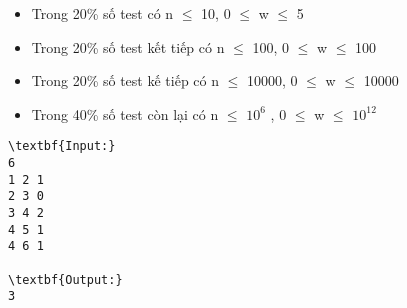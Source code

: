 \begin{itemize}
	\item Trong 20\% số test có n  $\le$  10, 0  $\le$  w  $\le$  5
	\item Trong 20\% số test kết tiếp có n  $\le$  100, 0  $\le$  w  $\le$  100
	\item Trong 20\% số test kế tiếp có n  $\le$  10000, 0  $\le$  w  $\le$  10000
	\item Trong 40\% số test còn lại có n  $\le$  $10^{6}$ , 0  $\le$  w  $\le$  $10^{12}$
\end{itemize}
\begin{verbatim}
\textbf{Input:}
6
1 2 1
2 3 0
3 4 2
4 5 1
4 6 1

\textbf{Output:}
3\end{verbatim}